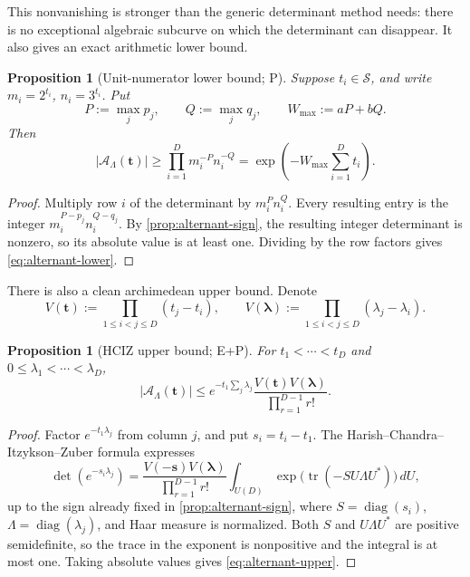 \documentclass[10pt,oneside]{article}
\newtheorem{proposition}[theorem]{Proposition}
\theoremstyle{definition}
\theoremstyle{remark}
\newcommand{\Sol}{\mathcal S}
\newcommand{\statusP}{\textsc{P}}
\newcommand{\statusE}{\textsc{E}}
\begin{document}
This nonvanishing is stronger than the generic determinant method needs: there is no exceptional algebraic subcurve on which the determinant can disappear.  It also gives an exact arithmetic lower bound.

\begin{proposition}[Unit-numerator lower bound; \statusP]
\label{prop:alternant-lower}
Suppose \(t_i\in\Sol\), and write \(m_i=2^{t_i}\), \(n_i=3^{t_i}\).  Put
\[
 P:=\max_jp_j,\qquad Q:=\max_jq_j,
 \qquad W_{\max}:=aP+bQ.
\]
Then
\begin{equation}
 |\mathscr A_\Lambda(\bm t)|
 \ge \prod_{i=1}^D m_i^{-P}n_i^{-Q}
 =\exp\!\left(-W_{\max}\sum_{i=1}^Dt_i\right).
\label{eq:alternant-lower}
\end{equation}
\end{proposition}

\begin{proof}
Multiply row \(i\) of the determinant by \(m_i^Pn_i^Q\).  Every resulting entry is the integer
\(m_i^{P-p_j}n_i^{Q-q_j}\).  By \cref{prop:alternant-sign}, the resulting integer determinant is nonzero, so its absolute value is at least one.  Dividing by the row factors gives \eqref{eq:alternant-lower}.
\end{proof}

There is also a clean archimedean upper bound.  Denote
\[
 V(\bm t):=\prod_{1\le i<j\le D}(t_j-t_i),
 \qquad
 V(\bm\lambda):=\prod_{1\le i<j\le D}(\lambda_j-\lambda_i).
\]

\begin{proposition}[HCIZ upper bound; \statusE+\statusP]
\label{prop:alternant-upper}
For \(t_1<\cdots<t_D\) and \(0\le\lambda_1<\cdots<\lambda_D\),
\begin{equation}
 |\mathscr A_\Lambda(\bm t)|
 \le
 e^{-t_1\sum_j\lambda_j}
 \frac{V(\bm t)V(\bm\lambda)}{\prod_{r=1}^{D-1}r!}.
\label{eq:alternant-upper}
\end{equation}
\end{proposition}

\begin{proof}
Factor \(e^{-t_1\lambda_j}\) from column \(j\), and put
\(s_i=t_i-t_1\).  The Harish--Chandra--Itzykson--Zuber formula \cite{HCIZ} expresses
\[
 \det(e^{-s_i\lambda_j})
 =\frac{V(-\bm s)V(\bm\lambda)}{\prod_{r=1}^{D-1}r!}
 \int_{U(D)}
   \exp\!\bigl(\operatorname{tr}(-S U\Lambda U^*)\bigr)\,dU,
\]
up to the sign already fixed in \cref{prop:alternant-sign}, where
\(S=\operatorname{diag}(s_i)\), \(\Lambda=\operatorname{diag}(\lambda_j)\), and Haar measure is normalized.  Both \(S\) and \(U\Lambda U^*\) are positive semidefinite, so the trace in the exponent is nonpositive and the integral is at most one.  Taking absolute values gives \eqref{eq:alternant-upper}.
\end{proof}
\end{document}
